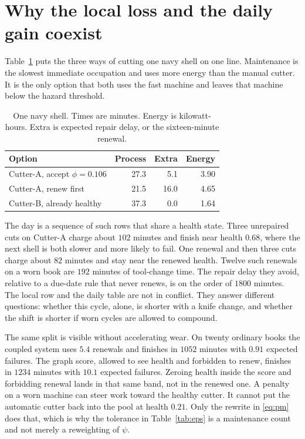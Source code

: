 \documentclass[10pt,a4paper]{article}
\begin{document}
\section{Why the local loss and the daily gain coexist}

Table~\ref{tab:one} puts the three ways of cutting one navy shell on one line. Maintenance is the slowest immediate occupation and uses more energy than the manual cutter. It is the only option that both uses the fast machine and leaves that machine below the hazard threshold.

\begin{table}[ht]
\centering
\caption{One navy shell. Times are minutes. Energy is kilowatt-hours. Extra is expected repair delay, or the sixteen-minute renewal.}
\label{tab:one}
\small
\begin{tabular}{lrrr}
\toprule
Option & Process & Extra & Energy \\
\midrule
Cutter-A, accept \(\phi = 0.106\) & 27.3 & 5.1 & 3.90 \\
Cutter-A, renew first & 21.5 & 16.0 & 4.65 \\
Cutter-B, already healthy & 37.3 & 0.0 & 1.64 \\
\bottomrule
\end{tabular}
\end{table}

The day is a sequence of such rows that share a health state. Three unrepaired cuts on Cutter-A charge about \(102\) minutes and finish near health \(0.68\), where the next shell is both slower and more likely to fail. One renewal and then three cuts charge about \(82\) minutes and stay near the renewed health. Twelve such renewals on a worn book are \(192\) minutes of tool-change time. The repair delay they avoid, relative to a due-date rule that never renews, is on the order of \(1800\) minutes. The local row and the daily table are not in conflict. They answer different questions: whether this cycle, alone, is shorter with a knife change, and whether the shift is shorter if worn cycles are allowed to compound.

The same split is visible without accelerating wear. On twenty ordinary books the coupled system uses \(5.4\) renewals and finishes in \(1052\) minutes with \(0.91\) expected failures. The graph score, allowed to see health and forbidden to renew, finishes in \(1234\) minutes with \(10.1\) expected failures. Zeroing health inside the score and forbidding renewal lands in that same band, not in the renewed one. A penalty on a worn machine can steer work toward the healthy cutter. It cannot put the automatic cutter back into the pool at health \(0.21\). Only the rewrite in \eqref{eq:pm} does that, which is why the tolerance in Table~\ref{tab:eps} is a maintenance count and not merely a reweighting of \(\psi\).
\end{document}
